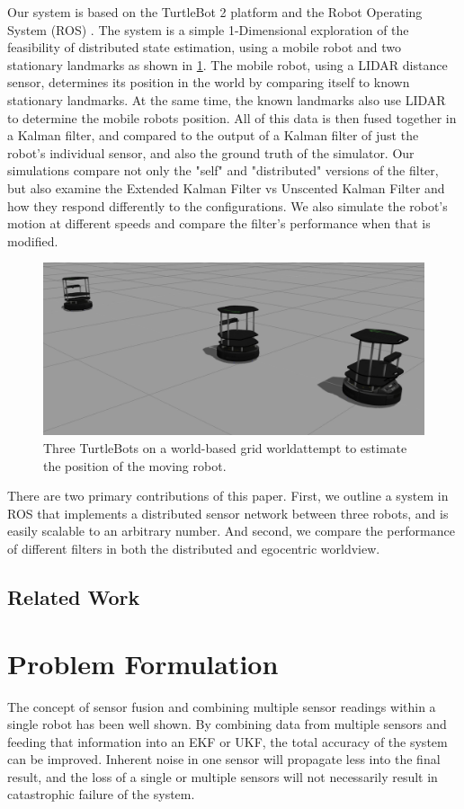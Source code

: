 \documentclass[conference]{IEEEtran} \usepackage[T1]{fontenc} \usepackage[backend=biber, style=ieee]{biblatex}
\begin{document}
Our system is based on the TurtleBot 2 platform and the Robot Operating System (ROS) \cite{ros_original}. The system is a simple 1-Dimensional exploration of the feasibility of distributed state estimation, using a mobile robot and two stationary landmarks as shown in \ref{pic1}. The mobile robot, using a LIDAR distance sensor, determines its position in the world by comparing itself to known stationary landmarks. At the same time, the known landmarks also use LIDAR to determine the mobile robots position. All of this data is then fused together in a Kalman filter, and compared to the output of a Kalman filter of just the robot's individual sensor, and also the ground truth of the simulator. Our simulations compare not only the "self" and "distributed" versions of the filter, but also examine the Extended Kalman Filter vs Unscented Kalman Filter and how they respond differently to the configurations. We also simulate the robot's motion at different speeds and compare the filter's performance when that is modified.

\begin{figure}[!ht]
\label{pic1} 
\centering 
\includegraphics[scale=.2]{sim1}
\caption{Three TurtleBots on a world-based grid worldattempt to estimate the position of the moving robot.}
\end{figure}

There are two primary contributions of this paper. First, we outline a system in ROS that implements a distributed sensor network between three robots, and is easily scalable to an arbitrary number. And second, we compare the performance of different filters in both the distributed and egocentric worldview.

\subsection{Related Work}

\section{Problem Formulation} \label{Problem Formulation} %
The concept of sensor fusion and combining multiple sensor readings within a single robot has been well shown. By
combining data from multiple sensors and feeding that information into an EKF or UKF, the total accuracy of the system
can be improved. Inherent noise in one sensor will propagate less into the final result, and the loss of a single or
multiple sensors will not necessarily result in catastrophic failure of the system.
\end{document}
